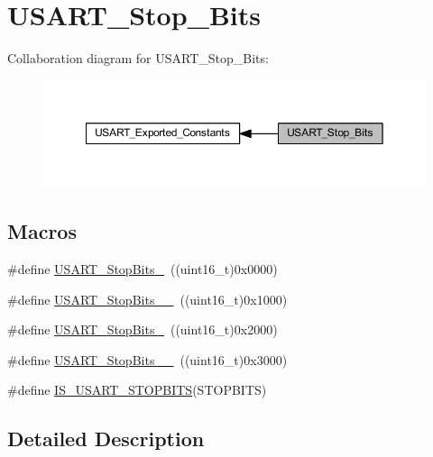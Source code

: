 \hypertarget{group___u_s_a_r_t___stop___bits}{}\section{U\+S\+A\+R\+T\+\_\+\+Stop\+\_\+\+Bits}
\label{group___u_s_a_r_t___stop___bits}
Collaboration diagram for U\+S\+A\+R\+T\+\_\+\+Stop\+\_\+\+Bits\+:
\nopagebreak
\begin{figure}[H]
\begin{center}
\leavevmode
\includegraphics[width=350pt]{group___u_s_a_r_t___stop___bits}
\end{center}
\end{figure}
\subsection*{Macros}
\begin{DoxyCompactItemize}
\item 
\#define \hyperlink{group___u_s_a_r_t___stop___bits_gae2cb35620ba001f0d63e9e0be93e4a05}{U\+S\+A\+R\+T\+\_\+\+Stop\+Bits\+\_}~((uint16\+\_\+t)0x0000)
\item 
\#define \hyperlink{group___u_s_a_r_t___stop___bits_ga2ad06e3acfb691735d05ab9a314e2e32}{U\+S\+A\+R\+T\+\_\+\+Stop\+Bits\+\_\+\_}~((uint16\+\_\+t)0x1000)
\item 
\#define \hyperlink{group___u_s_a_r_t___stop___bits_ga652058b6be2f48ac0d82d0e75537fc81}{U\+S\+A\+R\+T\+\_\+\+Stop\+Bits\+\_}~((uint16\+\_\+t)0x2000)
\item 
\#define \hyperlink{group___u_s_a_r_t___stop___bits_ga30897cc46d5b3790a9b14ffaba354527}{U\+S\+A\+R\+T\+\_\+\+Stop\+Bits\+\_\+\_}~((uint16\+\_\+t)0x3000)
\item 
\#define \hyperlink{group___u_s_a_r_t___stop___bits_ga6f9153c1fbee1058ba26ec88f0f20828}{I\+S\+\_\+\+U\+S\+A\+R\+T\+\_\+\+S\+T\+O\+P\+B\+I\+TS}(S\+T\+O\+P\+B\+I\+TS)
\end{DoxyCompactItemize}


\subsection{Detailed Description}


